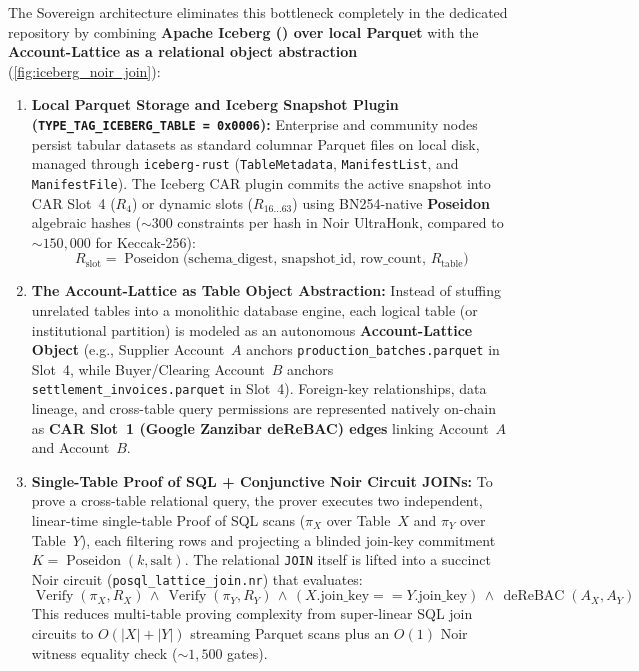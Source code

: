 \documentclass[a4paper,11pt,twoside,parskip=half-,headings=small]{scrartcl}
\newcommand{\code}[1]{\texttt{#1}}
\begin{document}
The Sovereign architecture eliminates this bottleneck completely in the dedicated repository  by combining \textbf{Apache Iceberg () over local Parquet} with the \textbf{Account-Lattice as a relational object abstraction} (\cref{fig:iceberg_noir_join}):
\begin{enumerate}[nosep]
  \item \textbf{Local Parquet Storage and Iceberg Snapshot Plugin (\code{TYPE\_TAG\_ICEBERG\_TABLE = 0x0006}):}
  Enterprise and community nodes persist tabular datasets as standard columnar Parquet files on local disk, managed through \code{iceberg-rust} (\code{TableMetadata}, \code{ManifestList}, and \code{ManifestFile}). The Iceberg CAR plugin commits the active snapshot into CAR Slot~4 ($R_4$) or dynamic slots ($R_{16\dots 63}$) using BN254-native \textbf{Poseidon} algebraic hashes ($\sim 300$ constraints per hash in Noir UltraHonk, compared to $\sim 150{,}000$ for Keccak-256):
  \begin{equation}
    R_{\text{slot}} = \operatorname{Poseidon}\bigl(\text{schema\_digest},\, \text{snapshot\_id},\, \text{row\_count},\, R_{\text{table}}\bigr)
  \end{equation}
  \item \textbf{The Account-Lattice as Table Object Abstraction:}
  Instead of stuffing unrelated tables into a monolithic database engine, each logical table (or institutional partition) is modeled as an autonomous \textbf{Account-Lattice Object} (e.g., Supplier Account~$A$ anchors \code{production\_batches.parquet} in Slot~4, while Buyer/Clearing Account~$B$ anchors \code{settlement\_invoices.parquet} in Slot~4). Foreign-key relationships, data lineage, and cross-table query permissions are represented natively on-chain as \textbf{CAR Slot~1 (Google Zanzibar deReBAC) edges} linking Account~$A$ and Account~$B$.
  \item \textbf{Single-Table Proof of SQL + Conjunctive Noir Circuit JOINs:}
  To prove a cross-table relational query, the prover executes two independent, linear-time single-table Proof of SQL scans ($\pi_X$ over Table~$X$ and $\pi_Y$ over Table~$Y$), each filtering rows and projecting a blinded join-key commitment $K = \operatorname{Poseidon}(k, \text{salt})$. The relational \code{JOIN} itself is lifted into a succinct Noir circuit (\code{posql\_lattice\_join.nr}) that evaluates:
  \begin{equation}
    \operatorname{Verify}(\pi_X, R_X) \,\land\, \operatorname{Verify}(\pi_Y, R_Y) \,\land\, (X.\text{join\_key} == Y.\text{join\_key}) \,\land\, \operatorname{deReBAC}(A_X, A_Y)
  \end{equation}
  This reduces multi-table proving complexity from super-linear SQL join circuits to $O(|X| + |Y|)$ streaming Parquet scans plus an $O(1)$ Noir witness equality check ($\sim 1{,}500$ gates).
\end{enumerate}
\end{document}

